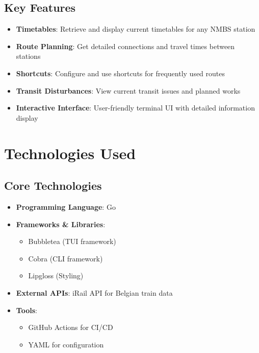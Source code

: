 \documentclass[10pt,a4paper]{article}
\begin{document}
\subsection{Key Features}
\begin{itemize}
	\item \textbf{Timetables}: Retrieve and display current timetables for any NMBS station
	\item \textbf{Route Planning}: Get detailed connections and travel times between stations
	\item \textbf{Shortcuts}: Configure and use shortcuts for frequently used routes
	\item \textbf{Transit Disturbances}: View current transit issues and planned works
	\item \textbf{Interactive Interface}: User-friendly terminal UI with detailed information display
\end{itemize}

\section{Technologies Used}
\subsection{Core Technologies}
\begin{itemize}
	\item \textbf{Programming Language}: Go
	\item \textbf{Frameworks \& Libraries}:
	      \begin{itemize}
		      \item Bubbletea (TUI framework)
		      \item Cobra (CLI framework)
		      \item Lipgloss (Styling)
	      \end{itemize}
	\item \textbf{External APIs}: iRail API for Belgian train data
	\item \textbf{Tools}:
	      \begin{itemize}
		      \item GitHub Actions for CI/CD
		      \item YAML for configuration
	      \end{itemize}
\end{itemize}
\end{document}
